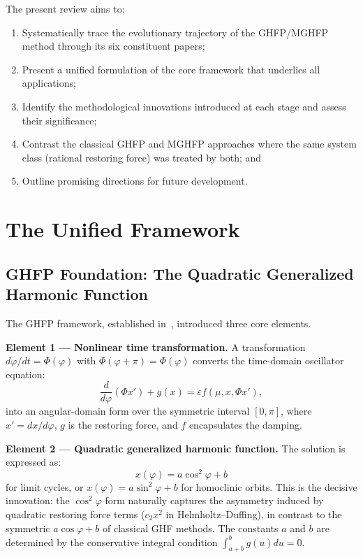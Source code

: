 \documentclass[11pt,a4paper]{article}
\begin{document}
The present review aims to:

\begin{enumerate}[leftmargin=2em]
\item Systematically trace the evolutionary trajectory of the GHFP/MGHFP method through its six constituent papers;
\item Present a unified formulation of the core framework that underlies all applications;
\item Identify the methodological innovations introduced at each stage and assess their significance;
\item Contrast the classical GHFP and MGHFP approaches where the same system class (rational restoring force) was treated by both; and
\item Outline promising directions for future development.
\end{enumerate}

\section{The Unified Framework}

\subsection{GHFP Foundation: The Quadratic Generalized Harmonic Function}

The GHFP framework, established in~\cite{P5}, introduced three core elements.

\medskip
\noindent\textbf{Element 1 --- Nonlinear time transformation.}
A transformation $d\varphi/dt = \Phi(\varphi)$ with $\Phi(\varphi+\pi) = \Phi(\varphi)$ converts the time-domain oscillator equation:
\begin{equation}
\frac{d}{d\varphi}(\Phi x') + g(x) = \varepsilon f(\mu, x, \Phi x'),
\label{eq:step1}
\end{equation}
into an angular-domain form over the symmetric interval $[0, \pi]$, where $x' = dx/d\varphi$, $g$ is the restoring force, and $f$ encapsulates the damping.

\medskip
\noindent\textbf{Element 2 --- Quadratic generalized harmonic function.}
The solution is expressed as:
\begin{equation}
\boxed{x(\varphi) = a \cos^2\varphi + b}
\label{eq:ghf}
\end{equation}
for limit cycles, or $x(\varphi) = a \sin^2\varphi + b$ for homoclinic orbits. This is the decisive innovation: the $\cos^2\varphi$ form naturally captures the asymmetry induced by quadratic restoring force terms ($c_2x^2$ in Helmholtz--Duffing), in contrast to the symmetric $a\cos\varphi + b$ of classical GHF methods. The constants $a$ and $b$ are determined by the conservative integral condition $\int_{a+b}^b g(u)du = 0$.
\end{document}

